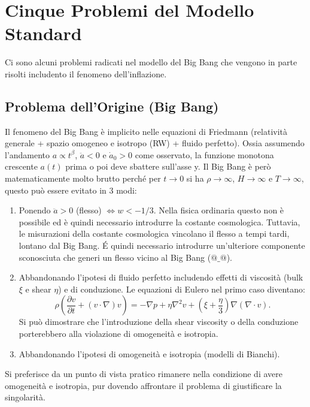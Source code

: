 \chapter{Cinque Problemi del Modello Standard}\label{4:ch}

Ci sono alcuni problemi radicati nel modello del Big Bang che vengono in parte risolti includento il fenomeno dell'inflazione.

\section{Problema dell'Origine (Big Bang)}
Il fenomeno del Big Bang è implicito nelle equazioni di Friedmann (relatività generale + spazio omogeneo e isotropo (RW) + fluido perfetto). Ossia assumendo l'andamento $a\propto t^\beta$, $\ddot{a}<0$ e $\dot{a}_0 >0$ come osservato, la funzione monotona crescente $a(t)$ prima o poi deve sbattere sull'asse y.   
Il Big Bang è però matematicamente molto brutto perché per $t\rightarrow 0$ si ha $\rho \rightarrow \infty$, $H \rightarrow \infty$ e $T \rightarrow \infty$, questo può essere evitato in 3 modi:
\vspace{0.5em}
\begin{enumerate}
    \item Ponendo $\ddot{a}>0$ (flesso) $\Leftrightarrow w<-1/3$. Nella fisica ordinaria questo non è possibile ed è quindi necessario introdurre la costante cosmologica. Tuttavia, le misurazioni della costante cosmologica vincolano il flesso a tempi tardi, lontano dal Big Bang. É quindi necessario introdurre un'ulteriore componente sconosciuta che generi un flesso vicino al Big Bang ($@ \_ @$).
    \item Abbandonando l'ipotesi di fluido perfetto includendo effetti di viscosità (bulk $\xi$ e shear $\eta$) e di conduzione. Le equazioni di Eulero nel primo caso diventano: $$ \rho \left ( \frac{\partial v}{\partial t} + (v \cdot\nabla)v \right )= -\nabla p +\eta \nabla^2v + \left ( \xi + \frac{\eta}{3} \right )\nabla(\nabla\cdot v). $$ Si può dimostrare che l'introduzione della shear viscosity o della conduzione porterebbero alla violazione di omogeneità e isotropia.
    \item Abbandonando l'ipotesi di omogeneità e isotropia (modelli di Bianchi).
\end{enumerate}

Si preferisce da un punto di vista pratico rimanere nella condizione di avere omogeneità e isotropia, pur dovendo affrontare il problema di giustificare la singolarità.

